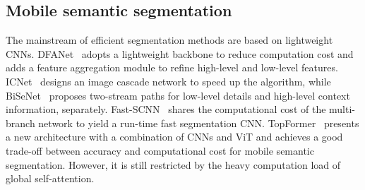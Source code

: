 \subsection{Mobile semantic segmentation}
The mainstream of efficient segmentation methods are based on lightweight CNNs. 
DFANet~\cite{li2019dfanet} adopts a lightweight backbone to reduce computation cost and adds a feature aggregation module to refine high-level and low-level features. 
ICNet~\cite{zhao2018icnet} designs an image cascade network to speed up the algorithm, while BiSeNet~\cite{yu2018bisenet, yu2021bisenet} proposes two-stream paths for low-level details and high-level context information, separately. 
Fast-SCNN~\cite{poudel2019fast} shares the computational cost of the multi-branch network to yield a run-time fast segmentation CNN. 
TopFormer~\cite{zhang2022topformer} presents a new architecture with a combination of CNNs and ViT and achieves a good trade-off between accuracy and computational cost for mobile semantic segmentation. 
However, it is still restricted by the heavy computation load of global self-attention. 
